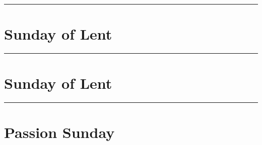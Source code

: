 {{\bigskip
\hrule
\medskip
{
\label{stjoseph-commem}
\def\begincollectcols{\begin{parcolumns}[rulebetween,colwidths={1=0.42\linewidth}]{2}}
\def\vrlinebreak{T}

\bigskip
\benedicamusdomino{}
}

{
\section{ Sunday of Lent}
\label{lent3}
\printcommonvespers[1]

\def\commemorations{If today is March 18 or 19, \emph{First Vespers of St Joseph} is commemorated as on page \pageref{stjoseph-commem}.  If today is March 24 or 25, \emph{First Vespers of the Annunciation} is commemorated as follows.}
\printcommemnote{}
}

\bigskip
\hrule
\medskip
{
\label{annunciation-commem}
\def\begincollectcols{\begin{parcolumns}[rulebetween,colwidths={1=0.43\linewidth}]{2}}


\bigskip

\benedicamusdominolentoreaster{}
}

\def\commemorations{If today is March 18 or 19, \emph{First Vespers of St Joseph} is commemorated as on page \pageref{stjoseph-commem}.  If today is March 24 or 25, \emph{First Vespers of the Annunciation} is commemorated as on page \pageref{annunciation-commem}.}
{
\section{ Sunday of Lent}
\label{lent4}
\def\liturgicalcolor{Violet or Rose}
\printcommonvespers[1]

\printcommemnote{}
}

\medskip
\hrule
{
\let\printhymnnote=\undefined
\section{Passion Sunday}
\label{lent5}\label{passionsunday}
\printcommonvespers[1]
\def\hymnlabel{hymn-vexillaregis}
\def\prehymn{\needspace{8\baselineskip}\printnote{All kneel for the sixth verse of the following hymn.}}
\def\vrlabel{vr-eripeme}
\def\hymninput{\gabcfolder/inc-hymn-VexillaRegis}
\def\premagtitle{\vspace{-0.5\baselineskip}}
\def\premagnificat{\needspace{14\baselineskip}}

}}}
